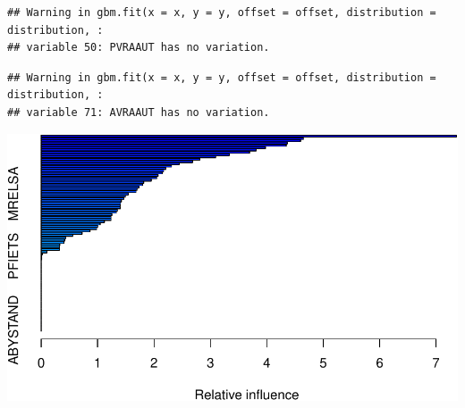 \documentclass[
]{article}
\begin{document}
\begin{verbatim}
## Warning in gbm.fit(x = x, y = y, offset = offset, distribution = distribution, :
## variable 50: PVRAAUT has no variation.
\end{verbatim}

\begin{verbatim}
## Warning in gbm.fit(x = x, y = y, offset = offset, distribution = distribution, :
## variable 71: AVRAAUT has no variation.
\end{verbatim}

\includegraphics{Disha_Gandhi_Take_Home_Exam_PDF_files/figure-latex/unnamed-chunk-82-1.pdf}
\end{document}
